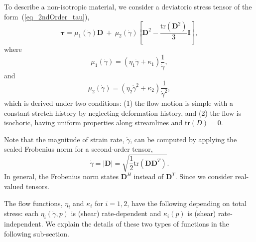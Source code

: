 To describe a non-isotropic material, we consider a deviatoric stress tensor of the form~(\ref{eq_2ndOrder_tau}), 
\begin{equation}
  {\bm {\bm \tau}}
  = \mu_1(\dot{\gamma}) {\bm D}
  \ +  \ 
 \mu_2 (\dot{\gamma})
  \left[ {\bm D}^2  - \frac{\text{tr}\left({\bm D}^2\right)}{3}{\bm I} \right],
\label{eq_2ndOrder_tau}
\end{equation}
where 
\begin{equation}
  \mu_1 (\dot{\gamma})
   = \left( \eta_1 \dot{\gamma}+ \kappa_1 \right) \frac{1}{\dot{\gamma}},
\label{eq_mu1_main}
\end{equation}
and 
\begin{equation}
  \mu_2 (\dot{\gamma}) = 
  \left( \eta_2  \dot{\gamma}^2
  +  \kappa_2 
  \right) \frac{1}{\dot{\gamma}^2},
  \label{eq_mu2_main}
\end{equation}
which is derived under two conditions:
(1) the flow motion is simple with a constant stretch history by neglecting deformation history, and (2) the flow is isochoric, having uniform properties along streamlines and tr$(D) = 0$. 

Note that the magnitude of strain rate, $\dot{\gamma}$, can be computed by applying the scaled Frobenius norm for a second-order tensor, 
\[
  \dot{\gamma}  = |\bm{D}| = \sqrt{\frac{1}{2}
    \text{tr}\left(\bm{D} \bm{D}^{T} \right)}.
\]
In general, the Frobenius norm states $\bm{D}^H$ instead of $\bm{D}^T$. Since we consider real-valued tensors.
\par
The flow functions, $\eta_i$ and $\kappa_i$ for $i = 1,2$, have the following depending on total stress: each $\eta_i(\dot{\gamma}, p)$ is (shear) rate-dependent and $\kappa_i (p)$ is (shear) rate-independent. 
We explain the details of these two types of functions in the following sub-section.

